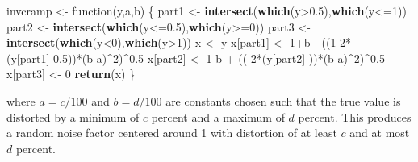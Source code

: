 \documentclass[]{article}
\newenvironment{Shaded}{\begin{snugshade}}{\end{snugshade}}
\newcommand{\KeywordTok}[1]{\textcolor[rgb]{0.13,0.29,0.53}{\textbf{{#1}}}}
\newcommand{\DecValTok}[1]{\textcolor[rgb]{0.00,0.00,0.81}{{#1}}}
\newcommand{\FloatTok}[1]{\textcolor[rgb]{0.00,0.00,0.81}{{#1}}}
\newcommand{\StringTok}[1]{\textcolor[rgb]{0.31,0.60,0.02}{{#1}}}
\newcommand{\NormalTok}[1]{{#1}}
\begin{document}
\begin{Shaded}
\begin{Highlighting}[]
\NormalTok{invcramp <-}\StringTok{ }\NormalTok{function(y,a,b) \{}
  \NormalTok{part1 <-}\StringTok{ }\KeywordTok{intersect}\NormalTok{(}\KeywordTok{which}\NormalTok{(y>}\FloatTok{0.5}\NormalTok{),}\KeywordTok{which}\NormalTok{(y<=}\DecValTok{1}\NormalTok{))}
  \NormalTok{part2 <-}\StringTok{ }\KeywordTok{intersect}\NormalTok{(}\KeywordTok{which}\NormalTok{(y<=}\FloatTok{0.5}\NormalTok{),}\KeywordTok{which}\NormalTok{(y>=}\DecValTok{0}\NormalTok{))}
  \NormalTok{part3 <-}\StringTok{ }\KeywordTok{intersect}\NormalTok{(}\KeywordTok{which}\NormalTok{(y<}\DecValTok{0}\NormalTok{),}\KeywordTok{which}\NormalTok{(y>}\DecValTok{1}\NormalTok{))}
  \NormalTok{x <-}\StringTok{ }\NormalTok{y}
  \NormalTok{x[part1] <-}\StringTok{  }\DecValTok{1}\NormalTok{+b -}\StringTok{ }\NormalTok{((}\DecValTok{1-2}\NormalTok{*(y[part1]-}\FloatTok{0.5}\NormalTok{))*(b-a)^}\DecValTok{2}\NormalTok{)^}\FloatTok{0.5}
  \NormalTok{x[part2] <-}\StringTok{  }\DecValTok{1}\NormalTok{-b +}\StringTok{ }\NormalTok{((  }\DecValTok{2}\NormalTok{*(y[part2]    ))*(b-a)^}\DecValTok{2}\NormalTok{)^}\FloatTok{0.5}
  \NormalTok{x[part3] <-}\StringTok{  }\DecValTok{0}
  \KeywordTok{return}\NormalTok{(x)}
  \NormalTok{\}}
\end{Highlighting}
\end{Shaded}

\noindent where \(a={c}/{100}\) and \(b={d}/{100}\) are constants chosen
such that the true value is distorted by a minimum of \(c\) percent and
a maximum of \(d\) percent. This produces a random noise factor centered
around 1 with distortion of at least \(c\) and at most \(d\) percent.
\end{document}
